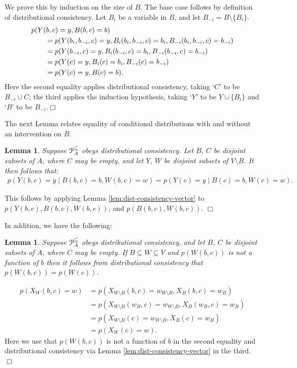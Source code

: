 \documentclass[11pt]{article}
\newtheorem{lemma}[theorem]{Lemma}
\begin{document}
 We prove this by induction on the size of $B$. The base case follows by definition of distributional consistency.
Let $B_i$ be a variable in $B$, and let $B_{-i} = B\setminus \{B_i\}$. 
\begin{align*}
\MoveEqLeft{p(Y({ b},{ c})=y, B(b,c)=b)}\\
 &= p(Y({ b_i, b_{-i}},{ c})=y, B_i(b_i,b_{-i},c)=b_i, B_{-i}(b_i,b_{-i},c)=b_{-i})\\
&= p(Y({b_{-i}},{ c})=y, B_i(b_{-i},c)=b_i, B_{-i}(b_{-i},c)=b_{-i})\\
&= p(Y({ c})=y, B_i(c)=b_i, B_{-i}(c)=b_{-i})\\
&= p(Y({ c})=y, B(c)=b).
\end{align*}
Here the second equality applies distributional consistency, taking `$C$' to be $B_{-i}\cup C$; the third applies the induction hypothesis,
taking `$Y$' to be $Y\cup \{B_i\}$ and `$B$' to be $B_{-i}$.\hfill$\Box$

The next Lemma relates equality of conditional distributions with and without an intervention on $B$.

\begin{lemma}\label{lem:cond-consistency} 
Suppose ${\cal P}^{\tiny \subseteq}_A$ obeys distributional consistency.
Let $B$, $C$ be disjoint subsets of $A$, where $C$ may be empty, and let $Y$, $W$ be disjoint subsets of $V\setminus B$. It then follows that:
\begin{align}\label{eq:consist-cond-swig}
p(Y({ b},{ c})\!=\!y \mid B({ b},{ c}) \!=\! { b}, W(b,c)\!=\!w) = p(Y({ c})\!=\!y \mid B({ c}) \!=\! { b}, W(c)\!=\!w).
\end{align}
\end{lemma}

 This follows by applying Lemma \ref{lem:dist-consistency-vector} to $p(Y({ b},{ c}), B({ b},{ c}), W(b,c))$,
and $p(B({ b},{ c}), W(b,c))$. \hfill$\Box$\par
\medskip

In addition, we have the following:
\begin{lemma}\label{lem:remove-b-from-joint-not-a-fn}
Suppose ${\cal P}^{\tiny \subseteq}_A$ obeys distributional consistency, and let
$B$, $C$ be disjoint subsets of $A$, where $C$ may be empty. If $B\subseteq W \subseteq V$ and  $p(W({ b},{ c}))$ is not a function of 
${ b}$ then it follows from distributional consistency that $p(W({b},{c}))=p(W({c}))$.
\end{lemma}

\begin{align*}
p(X_{W}(b,c)=w) &= p(X_{W\setminus B}(b,c)=w_{W\setminus B}, X_{B}(b,c)=w_{B})\\ 
&= p(X_{W\setminus B}(w_{B},c)=w_{W\setminus B}, X_{B}(w_{B},c)=w_{B})\\ 
&= p(X_{W\setminus B}(c)=w_{W\setminus B}, X_{B}(c)=w_{B})\\
&= p(X_{W}(c)=w).
\end{align*}
Here we use that $p(W({ b},{ c}))$ is not a function of 
${ b}$ in the second equality and distributional consistency via Lemma \ref{lem:dist-consistency-vector} in the third.
\hfill$\Box$
\\
\end{document}
